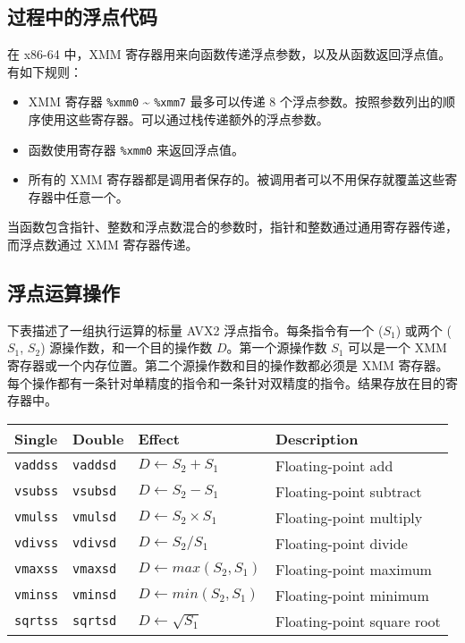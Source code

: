 \subsection{过程中的浮点代码}

在 x86-64 中，XMM 寄存器用来向函数传递浮点参数，以及从函数返回浮点值。有如下规则：

\begin{itemize}
    \item XMM 寄存器 \verb|%xmm0| \~{} \verb|%xmm7| 最多可以传递 8 个浮点参数。按照参数列出的顺序使用这些寄存器。可以通过栈传递额外的浮点参数。
    \item 函数使用寄存器 \verb|%xmm0| 来返回浮点值。
    \item 所有的 XMM 寄存器都是调用者保存的。被调用者可以不用保存就覆盖这些寄存器中任意一个。
\end{itemize}

当函数包含指针、整数和浮点数混合的参数时，指针和整数通过通用寄存器传递，而浮点数通过 XMM 寄存器传递。

\subsection{浮点运算操作}

下表描述了一组执行运算的标量 AVX2 浮点指令。每条指令有一个 ($S_1$) 或两个 ($S_1$, $S_2$) 源操作数，和一个目的操作数 $D$。第一个源操作数 $S_1$ 可以是一个 XMM 寄存器或一个内存位置。第二个源操作数和目的操作数都必须是 XMM 寄存器。每个操作都有一条针对单精度的指令和一条针对双精度的指令。结果存放在目的寄存器中。

\begin{table}[!ht]
    \centering
    \begin{tabular}{llll}
        \toprule
        Single & Double & Effect & Description \\
        \midrule
        \texttt{vaddss} & \texttt{vaddsd} & $D \leftarrow S_2 + S_1$ & Floating-point add \\
        \texttt{vsubss} & \texttt{vsubsd} & $D \leftarrow S_2 - S_1$ & Floating-point subtract \\
        \texttt{vmulss} & \texttt{vmulsd} & $D \leftarrow S_2 \times S_1$ & Floating-point multiply \\
        \texttt{vdivss} & \texttt{vdivsd} & $D \leftarrow S_2 / S_1$ & Floating-point divide \\
        \texttt{vmaxss} & \texttt{vmaxsd} & $D \leftarrow max(S_2, S_1)$ & Floating-point maximum \\
        \texttt{vminss} & \texttt{vminsd} & $D \leftarrow min(S_2, S_1)$ & Floating-point minimum \\
        \texttt{sqrtss} & \texttt{sqrtsd} & $D \leftarrow \sqrt{S_1}$ & Floating-point square root \\
        \bottomrule
    \end{tabular}
\end{table}

